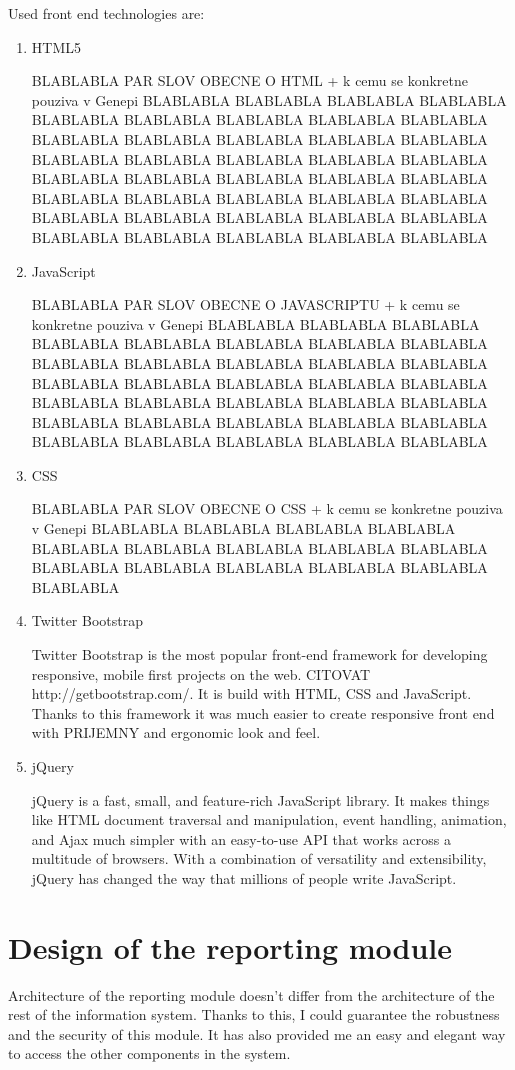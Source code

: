 \documentclass[thesis=B,english]{FITthesis}[2012/10/20]
\begin{document}
Used front end technologies are: 
\begin{enumerate}

\item{HTML5}

BLABLABLA PAR SLOV OBECNE O HTML + k cemu se konkretne pouziva v Genepi
BLABLABLA BLABLABLA BLABLABLA BLABLABLA BLABLABLA BLABLABLA BLABLABLA BLABLABLA BLABLABLA BLABLABLA BLABLABLA BLABLABLA BLABLABLA BLABLABLA BLABLABLA BLABLABLA BLABLABLA BLABLABLA BLABLABLA BLABLABLA BLABLABLA BLABLABLA BLABLABLA BLABLABLA BLABLABLA BLABLABLA BLABLABLA BLABLABLA BLABLABLA BLABLABLA BLABLABLA BLABLABLA BLABLABLA BLABLABLA BLABLABLA BLABLABLA BLABLABLA BLABLABLA BLABLABLA 
\item{JavaScript}

BLABLABLA PAR SLOV OBECNE O JAVASCRIPTU + k cemu se konkretne pouziva v Genepi
BLABLABLA BLABLABLA BLABLABLA BLABLABLA BLABLABLA BLABLABLA BLABLABLA BLABLABLA BLABLABLA BLABLABLA BLABLABLA BLABLABLA BLABLABLA BLABLABLA BLABLABLA BLABLABLA BLABLABLA BLABLABLA BLABLABLA BLABLABLA BLABLABLA BLABLABLA BLABLABLA BLABLABLA BLABLABLA BLABLABLA BLABLABLA BLABLABLA BLABLABLA BLABLABLA BLABLABLA BLABLABLA BLABLABLA 
\item{CSS}

BLABLABLA PAR SLOV OBECNE O CSS + k cemu se konkretne pouziva v Genepi
BLABLABLA BLABLABLA BLABLABLA BLABLABLA BLABLABLA BLABLABLA BLABLABLA BLABLABLA BLABLABLA BLABLABLA BLABLABLA BLABLABLA BLABLABLA BLABLABLA BLABLABLA 
\item{Twitter Bootstrap}

Twitter Bootstrap is the most popular front-end framework for developing responsive, mobile first projects on the web. CITOVAT http://getbootstrap.com/. It is build with HTML, CSS and JavaScript. Thanks to this framework it was much easier to create responsive front end with PRIJEMNY  and ergonomic look and feel.

\item{jQuery}

jQuery is a fast, small, and feature-rich JavaScript library. It makes things like HTML document traversal and manipulation, event handling, animation, and Ajax much simpler with an easy-to-use API that works across a multitude of browsers. With a combination of versatility and extensibility, jQuery has changed the way that millions of people write \cite{JJ92} JavaScript.
\end{enumerate}


\section{Design of the reporting module}
Architecture of the reporting module doesn't differ from the architecture of the rest of the information system. Thanks to this, I could guarantee the robustness and the security of this module. It has also provided me an easy and elegant way to access the other components in the system.
\end{document}
